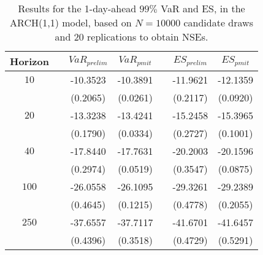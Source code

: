 \begin{table}[h] 
\centering 
\caption{Results for the 1-day-ahead $99\%$ VaR and ES, in the ARCH(1,1) model, based on $N=10000$ candidate draws and $20$ replications to obtain NSEs.} 
\label{tab:res_pmit_arch} 
\begin{tabular}{ccccccc}  
 Horizon & & $VaR_{prelim}$ & $VaR_{pmit}$ & & $ES_{prelim}$ & $ES_{pmit}$ \\ \hline 
$10$ & & -10.3523 & -10.3891 & & -11.9621 & -12.1359  \\ 
 & & (0.2065) & (0.0261) & & (0.2117) & (0.0920)   \\ [1ex] 
$20$ & & -13.3238 & -13.4241 & & -15.2458 & -15.3965  \\ 
 & & (0.1790) & (0.0334) & & (0.2727) & (0.1001)   \\ [1ex] 
$40$ & & -17.8440 & -17.7631 & & -20.2003 & -20.1596  \\ 
 & & (0.2974) & (0.0519) & & (0.3547) & (0.0875)   \\ [1ex] 
$100$ & & -26.0558 & -26.1095 & & -29.3261 & -29.2389  \\ 
 & & (0.4645) & (0.1215) & & (0.4778) & (0.2055)   \\ [1ex] 
$250$ & & -37.6557 & -37.7117 & & -41.6701 & -41.6457  \\ 
 & & (0.4396) & (0.3518) & & (0.4729) & (0.5291)   \\ [1ex] 
\hline 
\end{tabular} 
\end{table} 
